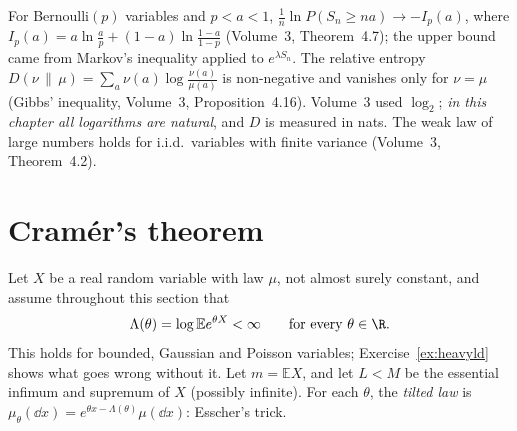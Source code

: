 \begin{reminder}
For Bernoulli$(p)$ variables and $p<a<1$, $\frac1n\ln P(S_n\ge na)\to-I_p(a)$, where $I_p(a)=a\ln\frac ap+(1-a)\ln\frac{1-a}{1-p}$ (Volume~3, Theorem~4.7); the upper bound came
from Markov's inequality applied to $e^{\lambda S_n}$. The relative entropy $D(\nu\,\|\,\mu)=\sum_a\nu(a)\log\frac{\nu(a)}{\mu(a)}$ is non-negative and vanishes only for $\nu=\mu$
(Gibbs' inequality, Volume~3, Proposition~4.16). Volume~3 used $\log_2$; \emph{in this chapter all logarithms are natural}, and $D$ is measured in nats. The weak law of large
numbers holds for i.i.d.\ variables with finite variance (Volume~3, Theorem~4.2).
\end{reminder}

\section{Cram\'er's theorem}

Let $X$ be a real random variable with law $\mu$, not almost surely constant, and assume throughout this section that
\begin{equation}\label{eq:cramercond}
\Lambda(\theta)=\log\mathbb Ee^{\theta X}<\infty\qquad\text{for every }\theta\in\R.
\end{equation}
This holds for bounded, Gaussian and Poisson variables; Exercise~\ref{ex:heavyld} shows what goes wrong without it. Let $m=\mathbb EX$, and let $L<M$ be the essential
infimum and supremum of $X$ (possibly infinite). For each $\theta$, the \emph{tilted law} is $\mu_\theta(\dd x)=e^{\theta x-\Lambda(\theta)}\mu(\dd x)$: Esscher's trick.

